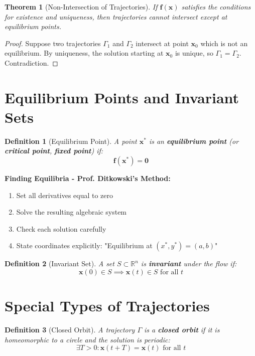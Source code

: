 \documentclass[12pt]{article}
\newtheorem{definition}{Definition}
\newtheorem{theorem}{Theorem}
\begin{document}
\begin{theorem}[Non-Intersection of Trajectories]
If $\mathbf{f}(\mathbf{x})$ satisfies the conditions for existence and uniqueness, then trajectories cannot intersect except at equilibrium points.
\end{theorem}

\begin{proof}
Suppose two trajectories $\Gamma_1$ and $\Gamma_2$ intersect at point $\mathbf{x}_0$ which is not an equilibrium. By uniqueness, the solution starting at $\mathbf{x}_0$ is unique, so $\Gamma_1 = \Gamma_2$. Contradiction.
\end{proof}

\section{Equilibrium Points and Invariant Sets}

\begin{definition}[Equilibrium Point]
A point $\mathbf{x}^*$ is an \textbf{equilibrium point} (or \textbf{critical point}, \textbf{fixed point}) if:
$$\mathbf{f}(\mathbf{x}^*) = \mathbf{0}$$
\end{definition}

\begin{examtip}
\textbf{Finding Equilibria - Prof. Ditkowski's Method:}
\begin{enumerate}
    \item Set all derivatives equal to zero
    \item Solve the resulting algebraic system
    \item Check each solution carefully
    \item State coordinates explicitly: "Equilibrium at $(x^*, y^*) = (a, b)$"
\end{enumerate}
\end{examtip}

\begin{definition}[Invariant Set]
A set $S \subset \mathbb{R}^n$ is \textbf{invariant} under the flow if:
$$\mathbf{x}(0) \in S \implies \mathbf{x}(t) \in S \text{ for all } t$$
\end{definition}

\section{Special Types of Trajectories}

\begin{definition}[Closed Orbit]
A trajectory $\Gamma$ is a \textbf{closed orbit} if it is homeomorphic to a circle and the solution is periodic:
$$\exists T > 0 : \mathbf{x}(t + T) = \mathbf{x}(t) \text{ for all } t$$
\end{definition}
\end{document}
